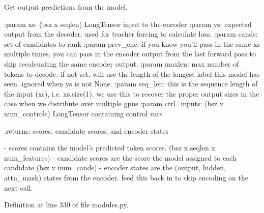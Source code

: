 \begin{DoxyVerb}Get output predictions from the model.

:param xs:
    (bsz x seqlen) LongTensor input to the encoder
:param ys:
    expected output from the decoder. used for teacher forcing
    to calculate loss.
:param cands:
    set of candidates to rank
:param prev_enc:
    if you know you'll pass in the same xs multiple times, you can pass
    in the encoder output from the last forward pass to skip
    recalcuating the same encoder output.
:param maxlen:
    max number of tokens to decode. if not set, will use the length of
    the longest label this model has seen. ignored when ys is not None.
:param seq_len:
    this is the sequence length of the input (xs), i.e. xs.size(1). we
    use this to recover the proper output sizes in the case when we
    distribute over multiple gpus
:param ctrl_inputs:
    (bsz x num_controls) LongTensor containing control vars

:returns:
    scores, candidate scores, and encoder states

    - scores contains the model's predicted token scores.
      (bsz x seqlen x num_features)
    - candidate scores are the score the model assigned to each candidate
      (bsz x num_cands)
    - encoder states are the (output, hidden, attn_mask) states from the
      encoder. feed this back in to skip encoding on the next call.
\end{DoxyVerb}
 

Definition at line 330 of file modules.\+py.


